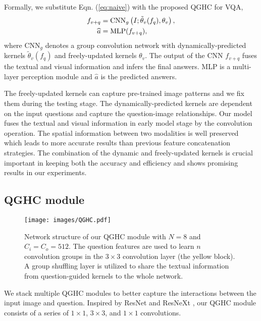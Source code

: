 \documentclass[runningheads]{llncs}
\begin{document}
Formally, we substitute Eqn. (\ref{eq:naive}) with the proposed QGHC for VQA,
\begin{align}
  f_{v+q} &= \textnormal{CNN}_g \left( I; \tilde{\theta}_v(f_q), \theta_v \right),\\
  \widehat{a} &= \textnormal{MLP}(f_{v+q}),
\end{align}
where CNN$_g$ denotes a group convolution network with dynamically-predicted kernels $\tilde{\theta}_v(f_q)$ and freely-updated kernels $\theta_v$. The output of the CNN $f_{v+q}$ fuses the textual and visual information and infers the final answers. MLP is a multi-layer perception module and $\widehat{a}$ is the predicted answers.

The freely-updated kernels can capture pre-trained image patterns and we fix them during the testing stage. The dynamically-predicted kernels are dependent on the input questions and capture the question-image relationships. Our model fuses the textual and visual information in early model stage by the convolution operation. The spatial information between two modalities is well preserved which leads to more accurate results than previous feature concatenation strategies. The combination of the dynamic and freely-updated kernels is crucial important in keeping both the accuracy and efficiency and shows promising results in our experiments.


\subsection{QGHC module}
\label{sec:lghc_module}

\begin{figure}[t]
  \begin{center}
    \texttt{[image: images/QGHC.pdf]}
  \end{center}
  \caption{Network structure of our QGHC module with $N=8$ and $C_i=C_o=512$. The question features are used to learn $n$ convolution groups in the $3\times 3$ convolution layer (the yellow block). A group shuffling layer is utilized to share the textual information from question-guided kernels to the whole network.}
  \label{fig:QGHC}
\end{figure}

We stack multiple QGHC modules to better capture the interactions between the input image and question. Inspired by ResNet \cite{he2016deep} and ResNeXt \cite{xie2016aggregated}, our QGHC module consists of a series of $1\times 1$, $3\times 3$, and $1\times 1$ convolutions. 
\end{document}
